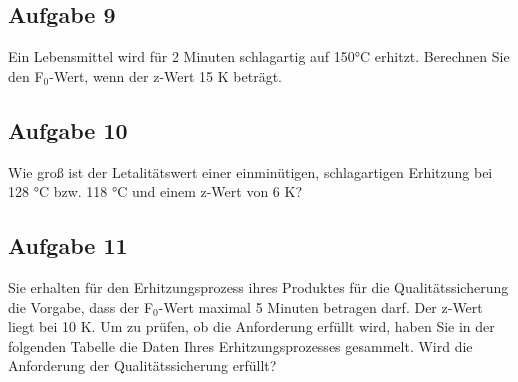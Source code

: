 \documentclass[a4paper,11pt]{article}
\newif\ifshowme
\begin{document}
\ifshowme
\antwort{
\begin{align*}
D_1 &= D_2 \cdot 10^{\frac{T_2-T_1}{z}} \\
\log(\frac{D_1}{D_2}) &= \frac{T_2-T_1}{z} \\
z &= \frac{T_2 - T_1}{\log(\frac{D_1}{D_2})} \\
z &= \frac{65 - 50}{\log(\frac{180}{5})} \\ 
 &= 9,64  ~\text{°C}
\end{align*}
}
\else
\fi



\subsection*{Aufgabe 9}
Ein Lebensmittel wird für 2 Minuten schlagartig auf 150°C erhitzt. Berechnen Sie den F$_0$-Wert, wenn der z-Wert 15 K beträgt.
\ifshowme
\antwort{
\begin{align*}
F_1 &= F_2 \cdot 10^{\frac{T_2-T_1}{z}} \\
F_1 &= 2 ~\text{min} \cdot 10^{\frac{150-121,1}{15}} \\
 &= 168,926 ~\text{min}
\end{align*}
}
\else
\fi


\subsection*{Aufgabe 10}
Wie groß ist der Letalitätswert einer einminütigen, schlagartigen Erhitzung bei 128 °C
bzw. 118 °C und einem z-Wert von 6 K?

\ifshowme
\antwort{
\begin{align*}
L &= 10^{\frac{T_2-121,1}{z}} \\ \\
L_{128} &= 10^{\frac{128-121,1}{6}} = 14,125 \\
L_{118} &= 10^{\frac{118-121,1}{6}} = 0,304
\end{align*}
}
\else
\fi


 

\subsection*{Aufgabe 11}
Sie erhalten für den Erhitzungsprozess ihres Produktes für die Qualitätssicherung die
Vorgabe, dass der F$_0$-Wert maximal 5 Minuten betragen darf. Der z-Wert liegt bei 10 K.
Um zu prüfen, ob die Anforderung erfüllt wird, haben Sie in der folgenden Tabelle die
Daten Ihres Erhitzungsprozesses gesammelt. Wird die Anforderung der
Qualitätssicherung erfüllt?
\end{document}
